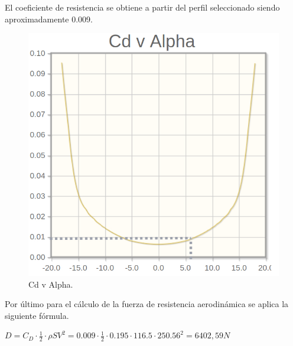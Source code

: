 \documentclass{article}
\begin{document}
\begin{enumerate}
        \bigskip

        El coeficiente de resistencia se obtiene a partir del perfil seleccionado siendo aproximadamente 0.009.
        \newline
        \begin{figure}
            \centering
                \includegraphics[width=0.44\columnwidth]{CdvAlpha.jpg}
            \caption{Cd v Alpha.}\label{fig:figura_4}
        \end{figure}
        \newline
        
        Por último para el cálculo de la fuerza de resistencia aerodinámica se aplica la siguiente fórmula.
        \begin{center}
            $D = C_{D} \cdot \frac{1}{2} \cdot \rho S V^2 = 0.009 \cdot \frac{1}{2} \cdot 0.195 \cdot 116.5 \cdot 250.56^2 = 6402,59N$
        \end{center}

    \end{enumerate} 
\end{document}
